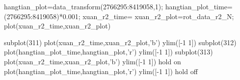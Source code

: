 hangtian_plot=data_transform(2766295:8419058,1);
hangtian_plot_time=(2766295:8419058)*0.001;
xuan_r2_time=
xuan_r2_plot=rot_data_r2_N;
plot(xuan_r2_time,xuan_r2_plot)



subplot(311)
plot(xuan_r2_time,xuan_r2_plot,'b')
ylim([-1 1])
subplot(312)
plot(hangtian_plot_time,hangtian_plot,'r')
ylim([-1 1])
subplot(313)
plot(xuan_r2_time,xuan_r2_plot,'b')
ylim([-1 1])
hold on
plot(hangtian_plot_time,hangtian_plot,'r')
ylim([-1 1])
hold off